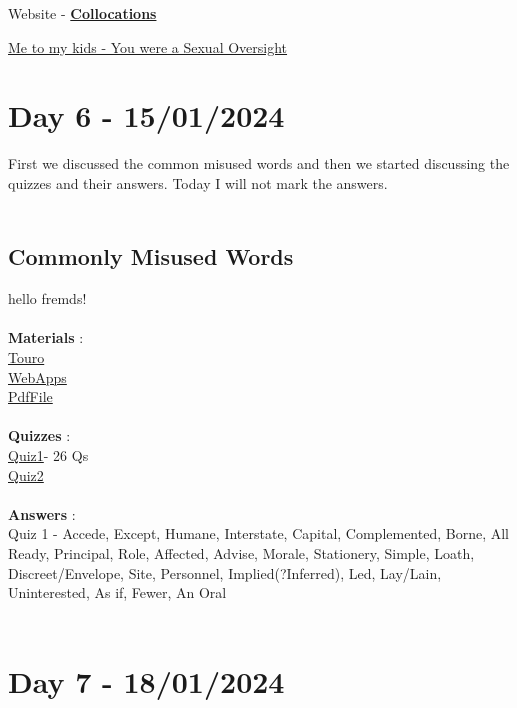 \documentclass[a4paper,30pt]{report}
\begin{document}
      \par Website - \href{https://englishclub.com/ref/Collocations}{\textbf{Collocations}}\\
      \par \underline{Me to my kids - You were a Sexual Oversight}
  
  \chapter{Day 6 - 15/01/2024}
    First we discussed the common misused words and then we started discussing the quizzes and their answers. Today I will not mark the answers.\\\\ 
    \section{Commonly Misused Words}
     hello fremds! \\\\ 
      \textbf{Materials} :\\
        \href{https://www.touro.edu/departments/writing-center/tutorials/commonly-misused-words/?authuser=1}{Touro}\\
        \href{https://webapps.towson.edu/ows/exercises/posttest2.aspx?authuser=1}{WebApps}\\
        \href{https://drive.google.com/file/d/1-yyI_RZh5uIYTxD-jouX7BSp531Qydqm/view?usp=sharing}{PdfFile}\\\\
      \textbf{Quizzes} : \\
        \href{https://www.niu.edu/writingtutorial/grammar/quizzes/ConfusedWords.htm?authuser=1}{Quiz1}- 26 Qs\\
        \href{https://public.wsu.edu/~campbelld/amlit/quiz/usage.htm?authuser=1}{Quiz2}\\\\
      \textbf{Answers} : \\
        Quiz 1 - Accede, Except, Humane, Interstate, Capital, Complemented, Borne, All Ready, Principal, Role, Affected, Advise, Morale, Stationery, Simple, Loath, Discreet/Envelope, Site, Personnel, Implied(?Inferred), Led, Lay/Lain, Uninterested, As if, Fewer, An Oral\\\\
  
  \chapter{Day 7 - 18/01/2024} %
  \label{chap:Day 7 - 18/01/2024}
\end{document}
